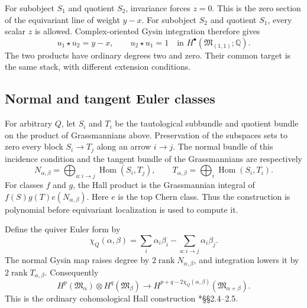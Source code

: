 For subobject $S_1$ and quotient $S_2$, invariance forces $z=0$.
This is the zero section of the equivariant line of weight $y-x$.
For subobject $S_2$ and quotient $S_1$, every scalar $z$ is allowed.
Complex-oriented Gysin integration therefore gives
\begin{equation}\label{cyhall:eq:arrow-products}
                    u_1\star u_2=y-x,
                    \qquad u_2\star u_1=1
 \quad\text{in }H^\bullet(\mathfrak M_{(1,1)};\mathbb Q).
\end{equation}
The two products have ordinary degrees two and zero.
Their common target is the same stack, with different extension
conditions.

\subsection{Normal and tangent Euler classes}

For arbitrary $Q$, let $S_i$ and $T_i$ be the tautological subbundle
and quotient bundle on the product of Grassmannians above.
Preservation of the subspaces sets to zero every block
$S_i\to T_j$ along an arrow $i\to j$.
The normal bundle of this incidence condition and the tangent bundle
of the Grassmannians are respectively
\begin{equation}\label{cyhall:eq:normal-tangent}
 N_{\alpha,\beta}=\bigoplus_{a:i\to j}
                   \operatorname{Hom}(S_i,T_j),
 \qquad
 T_{\alpha,\beta}=\bigoplus_i\operatorname{Hom}(S_i,T_i).
\end{equation}
For classes $f$ and $g$, the Hall product is the Grassmannian
integral of $f(S)g(T)e(N_{\alpha,\beta})$.
Here $e$ is the top Chern class. Thus the construction is polynomial
before equivariant localization is used to compute it.

Define the quiver Euler form by
\begin{equation}\label{cyhall:eq:quiver-euler}
 \chi_Q(\alpha,\beta)=
 \sum_i\alpha_i\beta_i-\sum_{a:i\to j}\alpha_i\beta_j.
\end{equation}
The normal Gysin map raises degree by
$2\operatorname{rank}N_{\alpha,\beta}$, and integration lowers it by
$2\operatorname{rank}T_{\alpha,\beta}$.
Consequently
\begin{equation}\label{cyhall:eq:ordinary-degree}
 H^p(\mathfrak M_\alpha)\otimes H^q(\mathfrak M_\beta)
 \longrightarrow
 H^{p+q-2\chi_Q(\alpha,\beta)}(\mathfrak M_{\alpha+\beta}).
\end{equation}
This is the ordinary cohomological Hall construction
\cite{cyhall:KS}*{\S\S2.4--2.5}.

